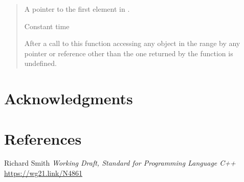 \documentclass{wg21}
\begin{document}
\begin{quote}
\begin{addedblock}
\begin{itemdescr}
\begin{enumerate}
\returns
A pointer to the first element in .
\end{enumerate}

\complexity Constant time

\begin{note}
After a call to this function accessing any object in the range  by any pointer or reference other than the one returned by the function is undefined.
\end{note}

\end{itemdescr}


\end{addedblock}
\end{quote}

\section{Acknowledgments}

\section{References}
\renewcommand{\section}[2]{}%



\begin{thebibliography}{9}

    Richard Smith
    \emph{Working Draft, Standard for Programming Language C++}\newline
    \url{https://wg21.link/N4861}

\end{thebibliography}
\end{document}
